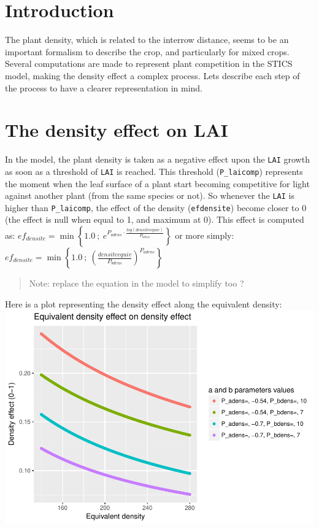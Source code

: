 \documentclass[]{book}
\theoremstyle{definition}
\theoremstyle{definition}
\theoremstyle{definition}
\theoremstyle{remark}
\begin{document}
\section{Introduction}\label{introduction-1}

The plant density, which is related to the interrow distance, seems to
be an important formalism to describe the crop, and particularly for
mixed crops. Several computations are made to represent plant
competition in the STICS model, making the density effect a complex
process. Lets describe each step of the process to have a clearer
representation in mind.

\section{The density effect on LAI}\label{the-density-effect-on-lai}

In the model, the plant density is taken as a negative effect upon the
\texttt{LAI} growth as soon as a threshold of \texttt{LAI} is reached.
This threshold (\texttt{P\_laicomp}) represents the moment when the leaf
surface of a plant start becoming competitive for light against another
plant (from the same species or not). So whenever the \texttt{LAI} is
higher than \texttt{P\_laicomp}, the effect of the density
(\texttt{efdensite}) become closer to 0 (the effect is null when equal
to 1, and maximum at 0). This effect is computed as:
\(ef_{densite}=\min\left\{1.0\ ;\ e^{P_{adens}\cdot\frac{log(densiteequiv)}{P_{bdens}}}\right\}\)
or more simply:
\(ef_{densite}=\min\left\{1.0\ ;\ (\frac{densiteequiv}{P_{bdens}})^{P_{adens}}\right\}\)

\begin{quote}
Note: replace the equation in the model to simplify too ?
\end{quote}

Here is a plot representing the density effect along the equivalent
density:
\includegraphics{Postdoc_steps_files/figure-latex/unnamed-chunk-12-1.pdf}
\end{document}
